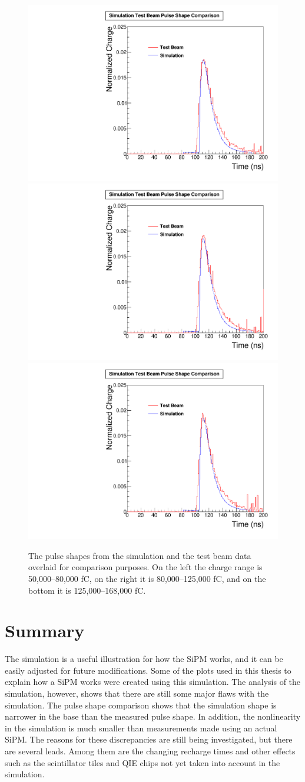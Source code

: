 \begin{figure}
\centering
\includegraphics[width=0.495\linewidth]{Figures/50Comparison.pdf}
\includegraphics[width=0.495\linewidth]{Figures/80Comparison.pdf}
\includegraphics[width=0.495\linewidth]{Figures/125Comparison.pdf}
\caption{The pulse shapes from the simulation and the test beam data overlaid for comparison purposes. On the left the charge range is 50,000--80,000 fC, on the right it is 80,000--125,000 fC, and on the bottom it is 125,000--168,000 fC.}
\label{fig:2comparison_together}
\end{figure}

\section{Summary}

The simulation is a useful illustration for how the SiPM works, and it can be easily adjusted for future modifications. Some of the plots used in this thesis to explain how a SiPM works were created using this simulation. The analysis of the simulation, however, shows that there are still some major flaws with the simulation. The pulse shape comparison shows that the simulation shape is narrower in the base than the measured pulse shape. In addition, the nonlinearity in the simulation is much smaller than measurements made using an actual SiPM. The reasons for these discrepancies are still being investigated, but there are several leads. Among them are the changing recharge times and other effects such as the scintillator tiles and QIE chips not yet taken into account in the simulation. 